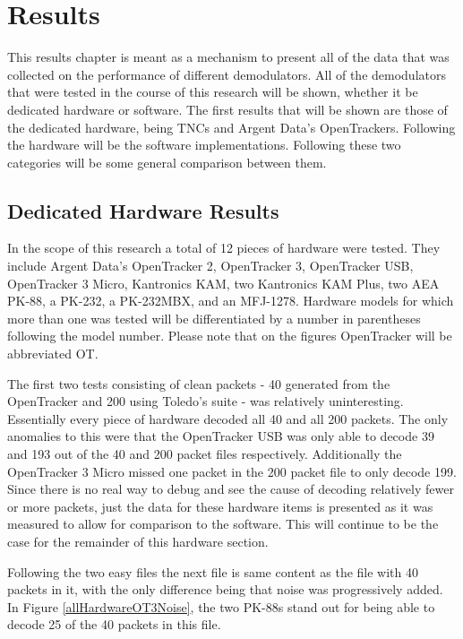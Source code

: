 \chapter{Results}
This results chapter is meant as a mechanism to present all of the data that was collected on the performance of different demodulators. All of the demodulators that were tested in the course of this research will be shown, whether it be dedicated hardware or software. The first results that will be shown are those of the dedicated hardware, being TNCs and Argent Data's OpenTrackers. Following the hardware will be the software implementations. Following these two categories will be some general comparison between them.

\section{Dedicated Hardware Results}
In the scope of this research a total of 12 pieces of hardware were tested. They include Argent Data's OpenTracker 2, OpenTracker 3, OpenTracker USB, OpenTracker 3 Micro, Kantronics KAM, two Kantronics KAM Plus, two AEA PK-88, a PK-232, a PK-232MBX, and an MFJ-1278. Hardware models for which more than one was tested will be differentiated by a number in parentheses following the model number. Please note that on the figures OpenTracker will be abbreviated OT.

The first two tests consisting of clean packets - 40 generated from the OpenTracker and 200 using Toledo's suite - was relatively uninteresting. Essentially every piece of hardware decoded all 40 and all 200 packets. The only anomalies to this were that the OpenTracker USB was only able to decode 39 and 193 out of the 40 and 200 packet files respectively. Additionally the OpenTracker 3 Micro missed one packet in the 200 packet file to only decode 199. Since there is no real way to debug and see the cause of decoding relatively fewer or more packets, just the data for these hardware items is presented as it was measured to allow for comparison to the software. This will continue to be the case for the remainder of this hardware section.

Following the two easy files the next file is same content as the file with 40 packets in it, with the only difference being that noise was progressively added. In Figure \ref{allHardwareOT3Noise}, the two PK-88s stand out for being able to decode 25 of the 40 packets in this file.

